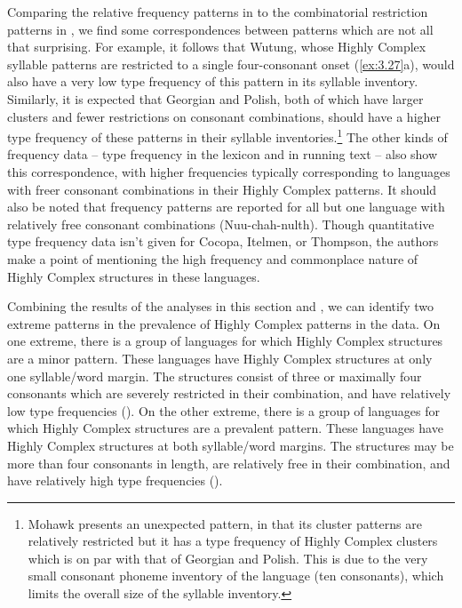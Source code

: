   Comparing the relative frequency patterns in  to the combinatorial restriction patterns in , we find some correspondences between patterns which are not all that surprising. For example, it follows that Wutung, whose Highly Complex syllable patterns are restricted to a single four-consonant onset (\ref{ex:3.27}a), would also have a very low type frequency of this pattern in its syllable inventory. Similarly, it is expected that Georgian and Polish, both of which have larger clusters and fewer restrictions on consonant combinations, should have a higher type frequency of these patterns in their syllable inventories.\footnote{{Mohawk presents an unexpected pattern, in that its cluster patterns are relatively restricted but it has a type frequency of Highly Complex clusters which is on par with that of Georgian and Polish. This is due to the very small consonant phoneme inventory of the language (ten consonants), which limits the overall size of the syllable inventory.}} The other kinds of frequency data -- type frequency in the lexicon and in running text -- also show this correspondence, with higher frequencies typically corresponding to languages with freer consonant combinations in their Highly Complex patterns. It should also be noted that frequency patterns are reported for all but one language with relatively free consonant combinations (Nuu-chah-nulth). Though quantitative type frequency data isn’t given for Cocopa, Itelmen, or Thompson, the authors make a point of mentioning the high frequency and commonplace nature of Highly Complex structures in these languages. 

  Combining the results of the analyses in this section and , we can identify two extreme patterns in the prevalence of Highly Complex patterns in the data. On one extreme, there is a group of languages for which Highly Complex structures are a minor pattern. These languages have Highly Complex structures at only one syllable/word margin. The structures consist of three or maximally four consonants which are severely restricted in their combination, and have relatively low type frequencies (). On the other extreme, there is a group of languages for which Highly Complex structures are a prevalent pattern. These languages have Highly Complex structures at both syllable/word margins. The structures may be more than four consonants in length, are relatively free in their combination, and have relatively high type frequencies ().

